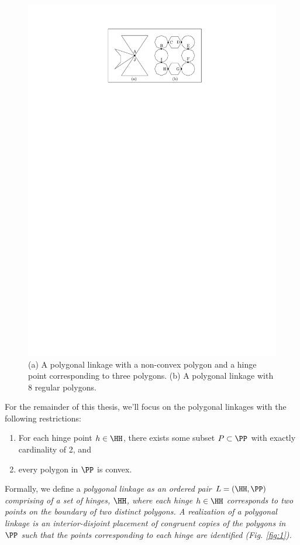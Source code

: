 \begin{figure}[h]
\begin{center}
\includegraphics[scale=1]{graphics/PolygonalLinkageExamples.pdf}
\end{center} 
\caption{(a) A polygonal linkage with a non-convex polygon and a hinge point corresponding to three 
polygons.  (b) A polygonal linkage with 8 regular polygons.}
\label{fig:linkage-2}
\end{figure}
For the remainder of this thesis, we'll focus on the polygonal linkages with the following 
restrictions:
\begin{enumerate}
 \item  For each hinge point $h \in \HH$, there exists some subset $P \subset \PP$ with 
exactly cardinality of 2, and
\item every polygon in $\PP$ is convex.
\end{enumerate}
Formally, we define a \it{polygonal linkage} as an ordered pair $L = (\HH,\PP)$ comprising of a 
set of hinges, $\HH$, where each hinge $h\in \HH$ corresponds to two points on the boundary of two 
distinct polygons. A \emph{realization} of a polygonal linkage is an interior-disjoint placement of 
congruent copies of the polygons in $\PP$ such that the points corresponding to each hinge are 
identified (Fig. \ref{fig:1}).